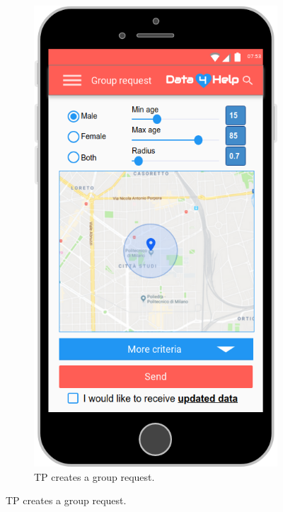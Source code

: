 \begin{figure}[ht]
  \centering
  \begin{subfigure}[ht]{0.38\linewidth}
    \addtocounter{subfigure}{6}  
    \includegraphics[width=\linewidth]{images/Mock-up/Group_Request.png}
    \caption{TP creates a group request.}
  \end{subfigure} \hfil \hfil \hfil

\end{figure}
